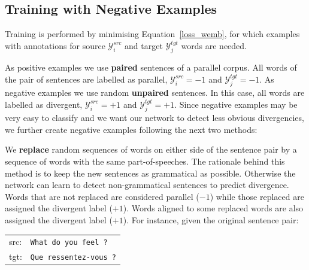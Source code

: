 \documentclass[11pt,a4paper]{article}
\begin{document}




\subsection{Training with Negative Examples}
\label{training}

Training is performed by minimising Equation~\ref{loss_wemb}, for which examples with annotations for source $\mathcal{Y}_i^{src}$ and target $\mathcal{Y}_j^{tgt}$ words are needed.

As positive examples we use {\bf paired} sentences of a parallel corpus. All words of the pair of sentences are labelled as parallel, $\mathcal{Y}_i^{src}=-1$ and $\mathcal{Y}_j^{tgt}=-1$. 
As negative examples we use random {\bf unpaired} sentences. In this case, all words are labelled as divergent, $\mathcal{Y}_i^{src}=+1$ and $\mathcal{Y}_j^{tgt}=+1$. 
Since negative examples may be very easy to classify and we want our network to detect less obvious divergencies, we further create negative examples following the next two methods:

We {\bf replace} random sequences of words on either side of the sentence pair by a sequence of words with the same part-of-speeches. 
The rationale behind this method is to keep the new sentences as grammatical as possible. 
Otherwise the network can learn to detect non-grammatical sentences to predict divergence.
Words that are not replaced are considered parallel ($-1$) while those replaced are assigned the divergent label ($+1$). 
Words aligned to some replaced words are also assigned the divergent label ($+1$). For instance, given the original sentence pair:

\begin{table}[h]
\begin{tabular}{ll}
src: & { \small \texttt{What do you feel ?}} \\
tgt: & { \small \texttt{Que ressentez-vous ?}} \\
\end{tabular}
\end{table}
\end{document}
